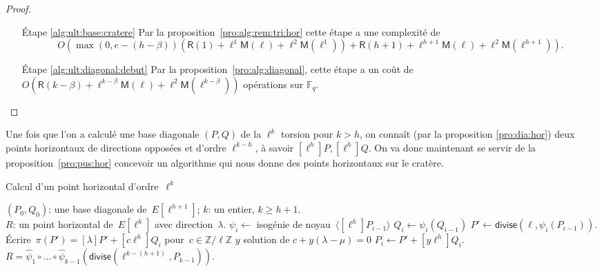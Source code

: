 \documentclass[10pt,a4paper]{book}
\theoremstyle{plain}
\theoremstyle{definition}
\theoremstyle{definition}
\theoremstyle{definition}
\theoremstyle{definition}
\theoremstyle{remark}
\theoremstyle{remark}
\theoremstyle{definition}
\begin{document}
\begin{proof}
\begin{enumerate}
\item[\'Etape \ref{alg:ult:base:cratere}] Par la proposition~\ref{pro:alg:rem:tri:hor}
cette étape a une complexité de \[O(\max(0,e-(h-\beta))(\mathsf{R}(1)+
\ell^{1}\mathsf{M}(\ell)+\ell^2 \mathsf{M}(\ell^{1}))+\mathsf{R}(h+1)+
\ell^{h+1}\mathsf{M}(\ell)+\ell^2 \mathsf{M}(\ell^{h+1})).\]

\item[\'Etape \ref{alg:ult:diagonal:debut}]	Par la proposition~\ref{pro:alg:diagonal}, cette étape a un coût de $O(\mathsf{R}(k-\beta) + \ell^{k-\beta}\mathsf{M}(\ell) + \ell^2\mathsf{M}(\ell^{k-\beta}) )$ opérations sur $\mathbb{F}_q$.

\end{enumerate}
\end{proof}

Une fois que l'on a calculé une base diagonale $(P,Q)$ de la $\ell^k$ torsion 
pour $k>h$, on connaît (par la proposition \ref{pro:dia:hor}) deux points 
horizontaux  de directions opposées et d'ordre $\ell^{k-h}$, à savoir $[\ell^{h}]P, 
[\ell^{h}]Q$. On va donc maintenant se servir de la proposition~\ref{pro:pus:hor} 
concevoir un algorithme qui nous donne des points horizontaux sur le cratère.

\begin{algorithm}
\caption{\label{alg:hor:poi}Calcul d'un point horizontal d'ordre~$\ell^k$}
\begin{algorithmic}[1]
\REQUIRE $(P_0, Q_0)$: une base diagonale de~$E[\ell^{h+1}]$; $k$: un entier,
$k \geqslant h + 1$.\\
\ENSURE $R$: un point horizontal de~$E[\ell^k]$ avec direction~$\lambda$.
\STATE $\psi_i \gets $ isogénie de noyau~$\langle [\ell^{h}] P_{i-1} \rangle$
\STATE $Q_{i} \gets \psi_i(Q_{i-1})$
\STATE\label{alg:horizontal:divide} $P' \gets \mathsf{divise}(\ell, \psi_i(P_{i-1}))$.
\STATE\label{alg:horizontal:frob} \'Ecrire~$\pi(P') = [\lambda] P' + [c \ell^{h}] Q_i$ pour~$c \in \mathbb{Z}/\ell\mathbb{Z}$
\STATE $y$ solution de $c+y(\lambda - \mu)=0$
\STATE  $P_{i} \gets P' + [y \ell^h] Q_i$.
\ENDFOR
\RETURN\label{alg:horizontal:final} $R = \widehat{\psi}_1 \circ … \circ \widehat{\psi}_{k-1}
  (\mathsf{divise}( \ell^{k-(h+1)}, P_{k-1}) )$. 
\end{algorithmic}
\end{algorithm}
\end{document}
